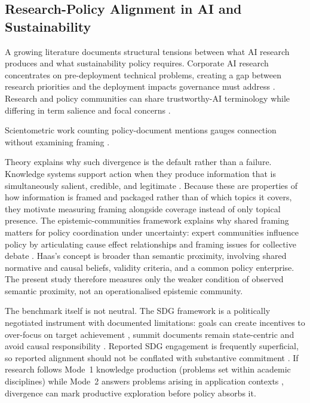 \documentclass[12pt,a4paper]{article}
\begin{document}
\subsection{Research-Policy Alignment in AI and Sustainability}\label{sec:rp-alignment}

A growing literature documents structural tensions between what AI research produces and what sustainability policy requires. Corporate AI research concentrates on pre-deployment technical problems, creating a gap between research priorities and the deployment impacts governance must address \parencite{Strauss2025}. Research and policy communities can share trustworthy-AI terminology while differing in term salience and focal concerns \parencite{ToneyWails2024}.

Scientometric work counting policy-document mentions gauges connection without examining framing \parencite{bornmann2016policy}.

Theory explains why such divergence is the default rather than a failure. Knowledge systems support action when they produce information that is simultaneously salient, credible, and legitimate \parencite{Cash2003}. Because these are properties of how information is framed and packaged rather than of which topics it covers, they motivate measuring framing alongside coverage instead of only topical presence. The epistemic-communities framework explains why shared framing matters for policy coordination under uncertainty: expert communities influence policy by articulating cause effect relationships and framing issues for collective debate \parencite{Haas1992}. Haas's concept is broader than semantic proximity, involving shared normative and causal beliefs, validity criteria, and a common policy enterprise. The present study therefore measures only the weaker condition of observed semantic proximity, not an operationalised epistemic community.

The benchmark itself is not neutral. The SDG framework is a politically negotiated instrument with documented limitations: goals can create incentives to over-focus on target achievement \parencite{FukudaParr2016}, summit documents remain state-centric and avoid causal responsibility \parencite{BexellJonsson2017}. Reported SDG engagement is frequently superficial, so reported alignment should not be conflated with substantive commitment \parencite{Heilinger2023, HerasSaizarbitoria2022}. If research follows Mode~1 knowledge production (problems set within academic disciplines) while Mode~2 answers problems arising in application contexts \parencite{Gibbons1994}, divergence can mark productive exploration before policy absorbs it.
\end{document}
